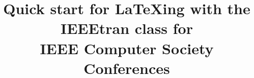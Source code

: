 \ifdefined\directlua
  \usepackage{chickenize}
  \suppressonecharbreak
\fi


\title{Quick start for LaTeXing with the IEEEtran class for\\ IEEE Computer Society Conferences}

\author{%
  \and
}


\maketitle


%
%


